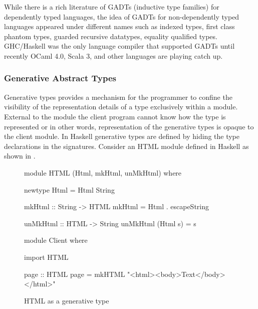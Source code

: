 \documentclass[manuscript,screen,nonacm]{acmart}
\begin{document}
While there is a rich literature of GADTs (inductive type families) for dependently typed languages\cite{dybjer_inductive_1991, dybjer_inductive_1994}, the idea of GADTs for non-dependently typed languages appeared under different names such as indexed types\cite{zenger_indexed_1997}, first class phantom types\cite{cheney_first-class_2003}, guarded recursive datatypes\cite{xi_guarded_2003}, equality qualified types\cite{sheard_meta-programming_2008}. GHC/Haskell was the only language compiler that supported GADTs\cite{peyton_jones_wobbly_2004} until recently OCaml 4.0\cite{garrigue_gadt_2011}, Scala 3\cite{TODO}, and other languages are playing catch up.

\subsubsection{Generative Abstract Types}
Generative types provides a mechanism for the programmer to confine the visibility of the representation details of a type exclusively within a module. External to the module the client program cannot know how the type is represented or in other words, representation of the generative types is opaque to the client module. In Haskell generative types are defined by hiding the type declarations in the signatures. Consider an HTML module defined in Haskell as shown in .
\begin{figure}[ht]
 \centering
 \begin{minipage}[ht]{0.4\linewidth}
 \begin{code}
 module HTML (Html, mkHtml, unMkHtml)
 where

 newtype Html = Html String

 mkHtml :: String -> HTML
 mkHtml = Html . escapeString

 unMkHtml :: HTML -> String
 unMkHtml (Html s) = s
 \end{code}
 \end{minipage}%
 \begin{minipage}[ht]{0.4\linewidth}
 \begin{code}
 module Client
 where

 import HTML

 page :: HTML
 page = mkHTML "<html><body>Text</body></html>"

 \end{code}
 \end{minipage}
 \caption{HTML as a generative type}
 \label{fig:html-generative-type}
\end{figure}
\end{document}
